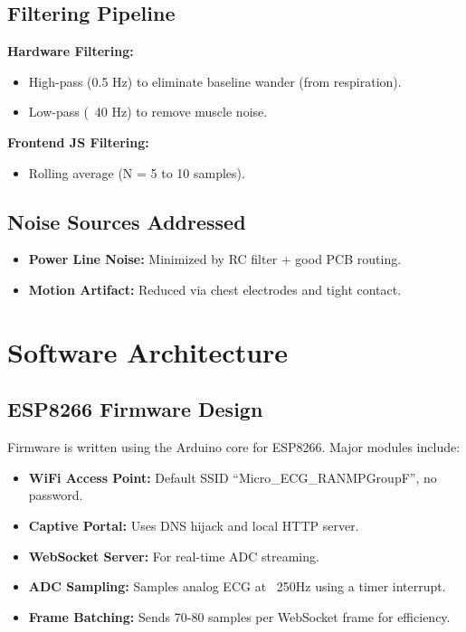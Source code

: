 \section{Filtering Pipeline}
\textbf{Hardware Filtering:}
\begin{itemize}
    \item High-pass (0.5 Hz) to eliminate baseline wander (from respiration).
    \item Low-pass (~40 Hz) to remove muscle noise.
\end{itemize}

\textbf{Frontend JS Filtering:}
\begin{itemize}
    \item Rolling average (N = 5 to 10 samples).
\end{itemize}

\section{Noise Sources Addressed}
\begin{itemize}
    \item \textbf{Power Line Noise:} Minimized by RC filter + good PCB routing.
    \item \textbf{Motion Artifact:} Reduced via chest electrodes and tight contact.
\end{itemize}






\chapter{Software Architecture}

\section{ESP8266 Firmware Design}
Firmware is written using the Arduino core for ESP8266. Major modules include:
\begin{itemize}
    \item \textbf{WiFi Access Point:} Default SSID “Micro\_ECG\_RANMPGroupF”, no password.
    \item \textbf{Captive Portal:} Uses DNS hijack and local HTTP server.
    \item \textbf{WebSocket Server:} For real-time ADC streaming.
    \item \textbf{ADC Sampling:} Samples analog ECG at ~250Hz using a timer interrupt.
    \item \textbf{Frame Batching:} Sends 70-80 samples per WebSocket frame for efficiency.
\end{itemize}

